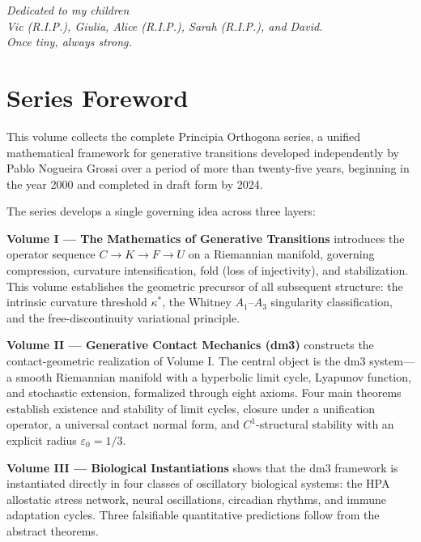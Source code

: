 \documentclass[12pt, oneside]{book}
\theoremstyle{plain}
\theoremstyle{definition}
\theoremstyle{remark}
\begin{document}
\thispagestyle{empty}
\vspace*{6cm}
\begin{center}
  \itshape
  Dedicated to my children\\[0.5em]
  Vic (R.I.P.), Giulia, Alice (R.I.P.), Sarah (R.I.P.), and David.\\[1em]
  \normalfont\textit{Once tiny, always strong.}
\end{center}
\cleardoublepage

\chapter*{Series Foreword}

This volume collects the complete Principia Orthogona series, a unified mathematical
framework for generative transitions developed independently by Pablo Nogueira Grossi
over a period of more than twenty-five years, beginning in the year 2000 and completed
in draft form by 2024.

The series develops a single governing idea across three layers:

\textbf{Volume I --- The Mathematics of Generative Transitions} introduces the operator
sequence $C \longrightarrow K \longrightarrow F \longrightarrow U$ on a Riemannian
manifold, governing compression, curvature intensification, fold (loss of injectivity),
and stabilization. This volume establishes the geometric precursor of all subsequent
structure: the intrinsic curvature threshold $\kappa^*$, the Whitney $A_1$--$A_3$
singularity classification, and the free-discontinuity variational principle.

\textbf{Volume II --- Generative Contact Mechanics (dm3)} constructs the
contact-geometric realization of Volume I. The central object is the dm3
system---a smooth Riemannian manifold with a hyperbolic limit cycle, Lyapunov function,
and stochastic extension, formalized through eight axioms. Four main theorems establish
existence and stability of limit cycles, closure under a unification operator, a
universal contact normal form, and $C^1$-structural stability with an explicit radius
$\varepsilon_0 = 1/3$.

\textbf{Volume III --- Biological Instantiations} shows that the dm3 framework is
instantiated directly in four classes of oscillatory biological systems: the HPA
allostatic stress network, neural oscillations, circadian rhythms, and immune
adaptation cycles. Three falsifiable quantitative predictions follow from the
abstract theorems.
\end{document}
